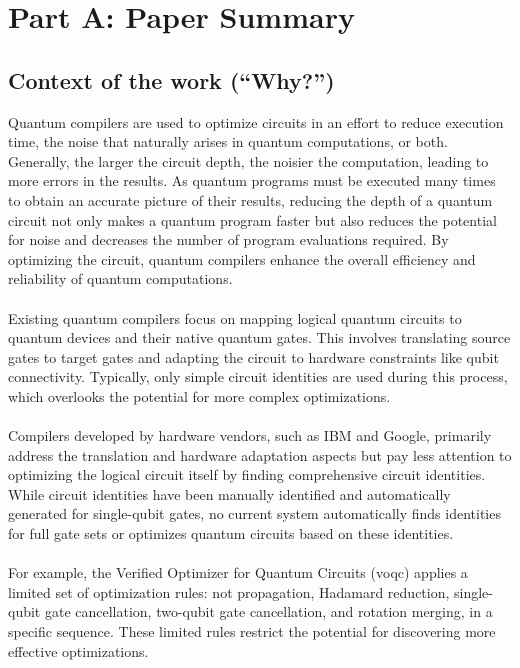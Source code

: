 \section{Part A: Paper Summary}

\subsection{Context of the work (``Why?'')}

Quantum compilers are used to optimize circuits in an effort to reduce execution time, the noise that naturally arises in quantum computations, or both. Generally, the larger the circuit depth, the noisier the computation, leading to more errors in the results. As quantum programs must be executed many times to obtain an accurate picture of their results, reducing the depth of a quantum circuit not only makes a quantum program faster but also reduces the potential for noise and decreases the number of program evaluations required. By optimizing the circuit, quantum compilers enhance the overall efficiency and reliability of quantum computations.
\\\\
Existing quantum compilers focus on mapping logical quantum circuits to quantum devices and their native quantum gates. This involves translating source gates to target gates and adapting the circuit to hardware constraints like qubit connectivity. Typically, only simple circuit identities are used during this process, which overlooks the potential for more complex optimizations.
\\\\
Compilers developed by hardware vendors, such as IBM and Google, primarily address the translation and hardware adaptation aspects but pay less attention to optimizing the logical circuit itself by finding comprehensive circuit identities. While circuit identities have been manually identified and automatically generated for single-qubit gates, no current system automatically finds identities for full gate sets or optimizes quantum circuits based on these identities.
\\\\
For example, the Verified Optimizer for Quantum Circuits (voqc) applies a limited set of optimization rules: not propagation, Hadamard reduction, single-qubit gate cancellation, two-qubit gate cancellation, and rotation merging, in a specific sequence. These limited rules restrict the potential for discovering more effective optimizations.
